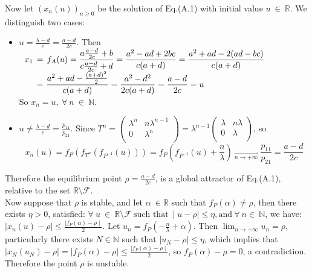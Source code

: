 \documentclass[11pt]{amsart}
\theoremstyle{definition}
\theoremstyle{remark}
\theoremstyle{example}
\numberwithin{equation}{section}
\begin{document}
\begin{description}[leftmargin=*]
\noindent Now let $(x_n(u))_{n\geq0}$ be the solution of Eq.(A.1) with initial value $u \ \in \ \mathbb{R}$.
We distinguish two cases:
\medskip
\begin{itemize}[leftmargin=*]
\item $u=\frac{\lambda-d}{c}=\frac{a-d}{2c}$. Then
\\
$\displaystyle{
\begin{array}{ccc}
               x_1\hspace{-2mm}&=&\hspace{-2mm}f_A(u) =\displaystyle{\frac{a\frac{a-d}{2c}+b}{c\frac{a-d}{2c}+d}}
=\displaystyle{\frac{a^2-ad+2bc}{c(a+d)}}=\displaystyle{\frac{a^2+ad-2(ad-bc)}{c(a+d)}} \\
                &=&\hspace{-1cm}
\displaystyle{\frac{a^2+ad-\frac{(a+d)^2}{2}}{c(a+d)}}=\displaystyle{\frac{a^2-d^2}{2c(a+d)}}
=\displaystyle{\frac{a-d}{2c}}=u \ \ \ \ \ \ \ \ \ \ \ \ \ \ \
\end{array}} $\\
So $x_n=u, \ \forall \ n \ \in \ \mathbb{N}.$
\medskip
\item $u\neq\frac{\lambda-d}{c}=\frac{p_{11}}{p_{21}}$. Since
$T^n=\left(\begin{array}{cc}
\lambda^n & n\lambda^{n-1} \\
0 & \lambda^n \\
\end{array}\right)=\lambda^{n-1}\left(\begin{array}{cc}
\lambda & n\lambda \\
0 & \lambda \\
\end{array}\right)$, so
$$x_n(u)=f_P(f_{T^n}(f_{P^{-1}}(u)))=f_P(f_{P^{-1}}(u)+\frac{n}{\lambda}) \ _ { \overrightarrow{n\rightarrow+\infty}} \
\frac{p_{11}}{p_{21}}=\frac{a-d}{2c}$$
\end{itemize}
\noindent
Therefore the equilibrium point $\rho=\frac{a-d}{2c}$, is a global attractor of Eq.(A.1),
relative to the set $\mathbb{R}\setminus\mathcal{F}.$\\
\noindent
Now suppose that $\rho$ is stable, and let $\alpha \ \in \mathbb{R}$ such that $f_P(\alpha)\neq\rho$,
then there exists $\eta>0$, satisfied: $\forall \ u \ \in \ \mathbb{R}\setminus\mathcal{F} \ \text{such that}
\ \mid u-\rho\mid\leq\eta, \text{and} \ \forall \ n \in \ \mathbb{N}$,
we have: $\mid x_n(u)-\rho\mid\leq\displaystyle{\frac{\mid f_P(\alpha)-\rho\mid}{2}}.$
Let $u_n=f_P(-\frac{n}{\lambda}+\alpha)$. Then  $\displaystyle{\lim_{n\rightarrow+\infty}u_n=\rho}$, particularly there exists $N\in\mathbb{N}$ such that $\mid u_N-\rho\mid\leq\eta$, which implies that
$\mid x_N(u_N)-\rho\mid=\mid f_P(\alpha)-\rho\mid\leq\displaystyle{\frac{\mid f_P(\alpha)-\rho\mid}{2}}$, so $f_P(\alpha)-\rho=0$, a contradiction. Therefore the point $\rho$ is unstable.\\


\end{description}
\end{document}
